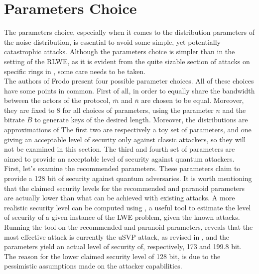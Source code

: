 \section{Parameters Choice}
The parameters choice, especially when it comes to the distribution parameters of the noise distribution, is essential to avoid some simple, yet potentially catastrophic attacks. Although the parameters choice is simpler than in the setting of the RLWE, as it is evident from the quite sizable section of attacks on specific rings in \cite{RLWE_attacks}, some care needs to be taken.\\
The authors of Frodo present four possible parameter choices. All of these choices have some points in common. First of all, in order to equally share the bandwidth between the actors of the protocol, $\bar{m}$ and $\bar{n}$ are chosen to be equal. Moreover, they are fixed to $8$ for all choices of parameters, using the parameter $n$ and the bitrate $B$ to generate keys of the desired length. Moreover, the distributions are approximations of 
The first two are respectively a toy set of parameters, and one giving an acceptable level of security only against classic attackers, so they will not be examined in this section. The third and fourth set of parameters are aimed to provide an acceptable level of security against quantum attackers.\\
First, let's examine the recommended parameters. These parameters claim to provide a 128 bit of security against quantum adversaries. 
It is worth mentioning that the claimed security levels for the recommended and paranoid parameters are actually lower than what can be achieved with existing attacks. A more realistic security level can be computed using \cite{parameters}, a useful tool to estimate the level of security of a given instance of the LWE problem, given the known attacks. Running the tool on the recommended and paranoid parameters, reveals that the most effective attack is currently the uSVP attack, as revised in \cite{RUSVP}, and the parameters yield an actual level of security of, respectively, 173 and 199.8 bit. The reason for the lower claimed security level of 128 bit, is due to the pessimistic assumptions made on the attacker capabilities.

